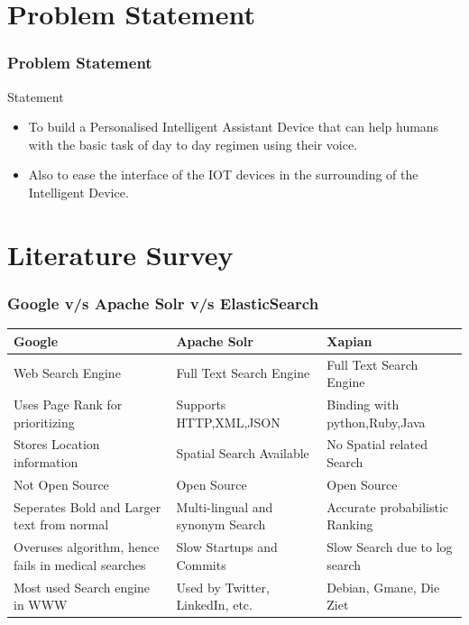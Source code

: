 \documentclass[xcolor=dvipsnames]{beamer}
\begin{document}
\section{Problem Statement}
\begin{frame} %
\frametitle{Problem Statement}
\begin{block}{Statement}
\begin{itemize}
\item To build a Personalised Intelligent Assistant Device that can help humans with the basic task of day to day regimen using their voice.
\item Also to ease the interface of the IOT devices in the surrounding of the Intelligent Device.
\end{itemize}
\end{block}
\end{frame}

\section{Literature Survey}
\begin{frame}
\frametitle{Google \small{v/s} \Large{Apache Solr} \small{v/s} \Large{ElasticSearch}}
\begin{table}
\begin{tabular}{l l l}
\toprule
\textbf{Google} & \textbf{Apache Solr} & \textbf{Xapian}\\
\midrule
\tiny{Web Search Engine} & \tiny{Full Text Search Engine} & \tiny{Full Text Search Engine} \\
\tiny{Uses Page Rank for prioritizing} & \tiny{Supports HTTP,XML,JSON} & \tiny{Binding with python,Ruby,Java} \\
\tiny{Stores Location information}& \tiny{Spatial Search Available}&\tiny{No Spatial related Search}\\
\tiny{Not Open Source}&\tiny{Open Source}&\tiny{Open Source}\\
\tiny{Seperates Bold and Larger text from normal}& \tiny{Multi-lingual and synonym Search}&\tiny{Accurate probabilistic Ranking}\\
\tiny{Overuses algorithm, hence fails in medical searches}&\tiny{Slow Startups and Commits}&\tiny{Slow Search due to log search}\\
\tiny{Most used Search engine in WWW}&\tiny{Used by Twitter, LinkedIn, etc.}&\tiny{Debian, Gmane, Die Ziet}\\
\bottomrule
\end{tabular}
\end{table}
\end{frame}
\end{document}
